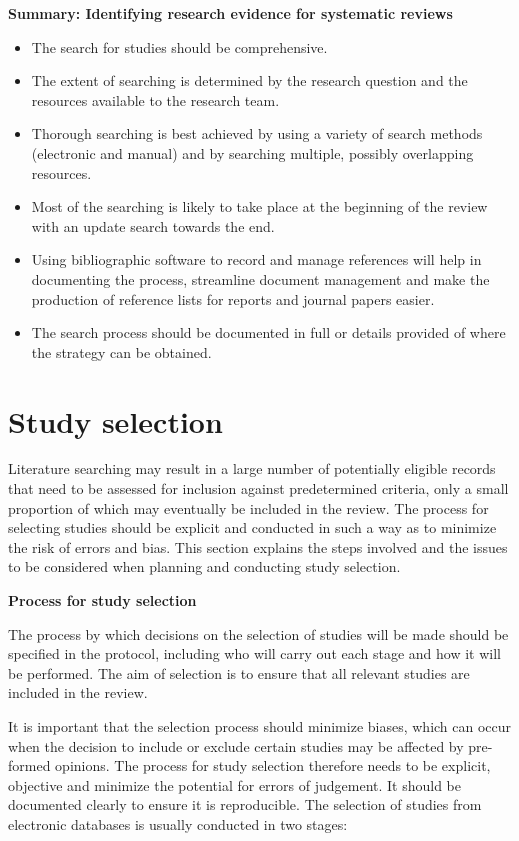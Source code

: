 \documentclass[
  11pt,
  a4paper,
  DIV=11,
  numbers=noendperiod]{scrreprt}
\begin{document}
\textbf{Summary: Identifying research evidence for systematic reviews}

\begin{itemize}
\item
  The search for studies should be comprehensive.
\item
  The extent of searching is determined by the research question and the
  resources available to the research team.
\item
  Thorough searching is best achieved by using a variety of search
  methods (electronic and manual) and by searching multiple, possibly
  overlapping resources.
\item
  Most of the searching is likely to take place at the beginning of the
  review with an update search towards the end.
\item
  Using bibliographic software to record and manage references will help
  in documenting the process, streamline document management and make
  the production of reference lists for reports and journal papers
  easier.
\item
  The search process should be documented in full or details provided of
  where the strategy can be obtained.
\end{itemize}

\section{Study selection}\label{study-selection-1}

Literature searching may result in a large number of potentially
eligible records that need to be assessed for inclusion against
predetermined criteria, only a small proportion of which may eventually
be included in the review. The process for selecting studies should be
explicit and conducted in such a way as to minimize the risk of errors
and bias. This section explains the steps involved and the issues to be
considered when planning and conducting study selection.

\textbf{Process for study selection}

The process by which decisions on the selection of studies will be made
should be specified in the protocol, including who will carry out each
stage and how it will be performed. The aim of selection is to ensure
that all relevant studies are included in the review.

It is important that the selection process should minimize biases, which
can occur when the decision to include or exclude certain studies may be
affected by pre-formed opinions. The process for study selection
therefore needs to be explicit, objective and minimize the potential for
errors of judgement. It should be documented clearly to ensure it is
reproducible. The selection of studies from electronic databases is
usually conducted in two stages:
\end{document}
